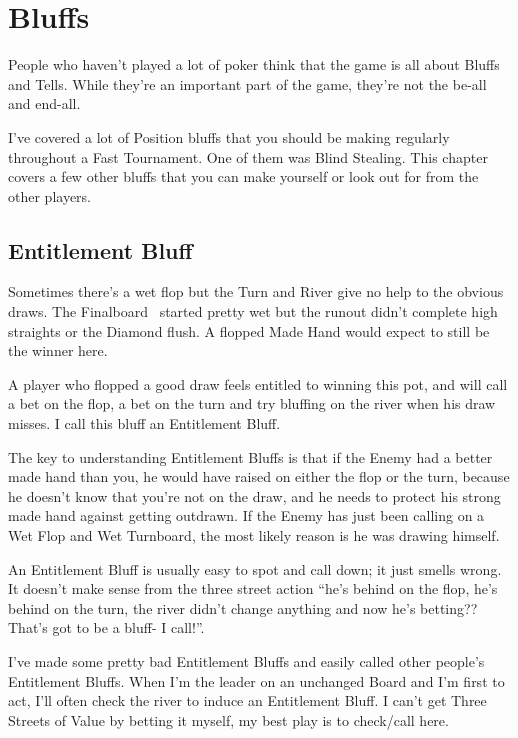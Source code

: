 \chapter{Bluffs}


People who haven't played a lot of poker think that the game
is all about Bluffs and Tells. While they're an important
part of the game, they're not the be-all and end-all.

I've covered a lot of Position bluffs that you should be making
regularly throughout a Fast Tournament. One of them was
Blind Stealing. This chapter covers a few other bluffs that you can
make yourself or look out for from the other players.

\section{Entitlement Bluff}

Sometimes there's a wet flop but the Turn and River give no help
to the obvious draws. The Finalboard \Jd\tend\fivec\twoh\sixh\ started
pretty wet but the runout didn't complete high straights or the
Diamond flush. A flopped Made Hand would expect to still be the winner
here.

A player who flopped a good draw feels entitled to winning
this pot, and will call a bet on the flop, a bet on the turn
and try bluffing on the river when his draw misses. I call
this bluff an Entitlement Bluff.

The key to understanding Entitlement Bluffs is that if the Enemy had a
better made hand than you, he would have raised on either the flop or
the turn, because he doesn't know that you're not on the draw, and he
needs to protect his strong made hand against getting outdrawn. If the
Enemy has just been calling on a Wet Flop and Wet Turnboard, the most
likely reason is he was drawing himself.

An Entitlement Bluff is usually easy to spot and call down; it
just smells wrong. It doesn't make sense from the three street action
``he's behind on the flop, he's behind on the turn, the river
didn't change anything and now he's betting?? That's got to be
a bluff- I call!''.

I've made some pretty bad Entitlement Bluffs and easily called
other people's Entitlement Bluffs. When I'm the leader on
an unchanged Board and I'm first to act, I'll often check the
river to induce an Entitlement Bluff. I can't get Three Streets
of Value by betting it myself, my best play is to check/call here.

